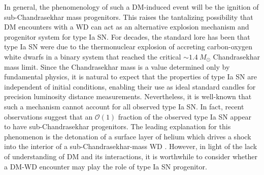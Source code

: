 \documentclass[twocolumn,preprintnumbers,amsmath,amssymb,prd, superscriptaddress]{revtex4} %
\newcommand{\OO}{\mathcal{O}}
\begin{document}
In general, the phenomenology of such a DM-induced event will be the ignition of sub-Chandrasekhar mass progenitors.
This raises the tantalizing possibility that DM encounters with a WD can act as an alternative explosion mechanism and progenitor system for type Ia SN.
For decades, the standard lore has been that type Ia SN were due to the thermonuclear explosion of accreting carbon-oxygen white dwarfs in a binary system that reached the critical $\sim 1.4 ~M_{\odot}$ Chandrasekhar mass limit.
Since the Chandrasekhar mass is a value determined only by fundamental physics, it is natural to expect that the properties of type Ia SN are independent of initial conditions, enabling their use as ideal standard candles for precision luminosity distance measurements.
Nevertheless, it is well-known that such a mechanism cannot account for all observed type Ia SN.
In fact, recent observations \cite{Scalzo:2014sap, Scalzo:2014wxa} suggest that an $\OO(1)$ fraction of the observed type Ia SN appear to have sub-Chandrasekhar progenitors.
The leading explanation for this phenomenon is the detonation of a surface layer of helium which drives a shock into the interior of a sub-Chandrasekhar-mass WD \cite{Woosley1994,Fink:2007fv}.
However, in light of the lack of understanding of DM and its interactions, it is worthwhile to consider whether a DM-WD encounter may play the role of type Ia SN progenitor.
\end{document}
